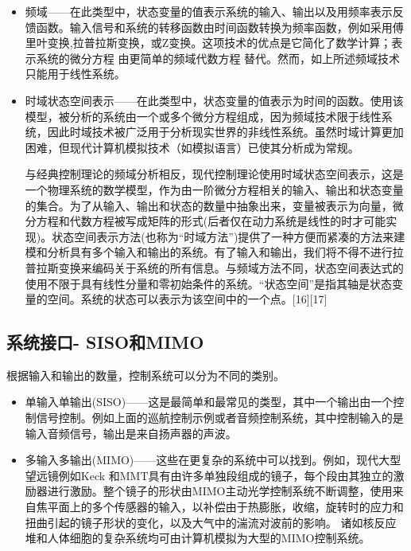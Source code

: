 \begin{itemize}
\item 频域——在此类型中，状态变量的值表示系统的输入、输出以及用频率表示反馈函数。输入信号和系统的转移函数由时间函数转换为频率函数，例如采用傅里叶变换,拉普拉斯变换，或Z变换。这项技术的优点是它简化了数学计算；表示系统的微分方程 由更简单的频域代数方程 替代。然而，如上所述频域技术只能用于线性系统。
\item 时域状态空间表示——在此类型中，状态变量的值表示为时间的函数。使用该模型，被分析的系统由一个或多个微分方程组成，因为频域技术限于线性系统，因此时域技术被广泛用于分析现实世界的非线性系统。虽然时域计算更加困难，但现代计算机模拟技术（如模拟语言）已使其分析成为常规。

与经典控制理论的频域分析相反，现代控制理论使用时域状态空间表示，这是一个物理系统的数学模型，作为由一阶微分方程相关的输入、输出和状态变量的集合。为了从输入、输出和状态的数量中抽象出来，变量被表示为向量，微分方程和代数方程被写成矩阵的形式(后者仅在动力系统是线性的时才可能实现)。状态空间表示方法(也称为“时域方法”)提供了一种方便而紧凑的方法来建模和分析具有多个输入和输出的系统。有了输入和输出，我们将不得不进行拉普拉斯变换来编码关于系统的所有信息。与频域方法不同，状态空间表达式的使用不限于具有线性分量和零初始条件的系统。“状态空间”是指其轴是状态变量的空间。系统的状态可以表示为该空间中的一个点。[16][17]

\end{itemize}


\subsection{系统接口- SISO和MIMO}

根据输入和输出的数量，控制系统可以分为不同的类别。

\begin{itemize}
\item 单输入单输出(SISO)——这是最简单和最常见的类型，其中一个输出由一个控制信号控制。例如上面的巡航控制示例或者音频控制系统，其中控制输入的是输入音频信号，输出是来自扬声器的声波。
\item 多输入多输出(MIMO)——这些在更复杂的系统中可以找到。例如，现代大型望远镜例如Keck 和MMT具有由许多单独段组成的镜子，每个段由其独立的激励器进行激励。整个镜子的形状由MIMO主动光学控制系统不断调整，使用来自焦平面上的多个传感器的输入，以补偿由于热膨胀，收缩，旋转时的应力和扭曲引起的镜子形状的变化，以及大气中的湍流对波前的影响。 诸如核反应堆和人体细胞的复杂系统均可由计算机模拟为大型的MIMO控制系统。
\end{itemize}

